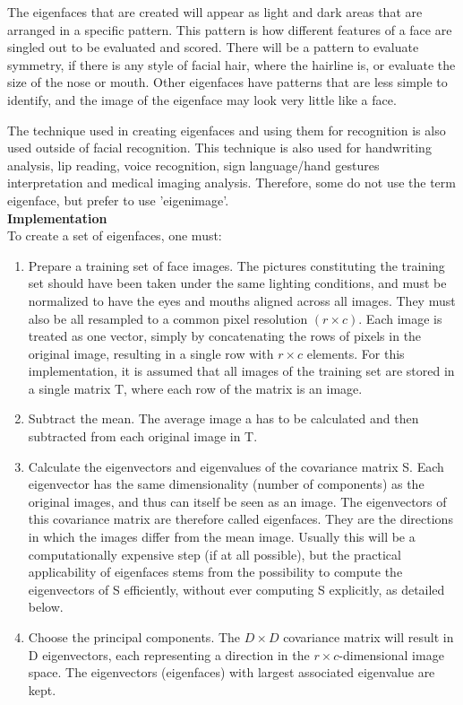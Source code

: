 \documentclass[12pt]{article}			%
\begin{document}
The eigenfaces that are created will appear as light and dark areas that are arranged in a specific pattern. This pattern is how different features of a face are singled out to be evaluated and scored. There will be a pattern to evaluate symmetry, if there is any style of facial hair, where the hairline is, or evaluate the size of the nose or mouth. Other eigenfaces have patterns that are less simple to identify, and the image of the eigenface may look very little like a face.

The technique used in creating eigenfaces and using them for recognition is also used outside of facial recognition. This technique is also used for handwriting analysis, lip reading, voice recognition, sign language/hand gestures interpretation and medical imaging analysis. Therefore, some do not use the term eigenface, but prefer to use 'eigenimage'.\\[2ex]
{\bf Implementation}\\
To create a set of eigenfaces, one must:
\begin{enumerate}
\item Prepare a training set of face images. The pictures constituting the training set should have been taken under the same lighting conditions, and must be normalized to have the eyes and mouths aligned across all images. They must also be all resampled to a common pixel resolution $(r \times c)$. Each image is treated as one vector, simply by concatenating the rows of pixels in the original image, resulting in a single row with $r \times c$ elements. For this implementation, it is assumed that all images of the training set are stored in a single matrix T, where each row of the matrix is an image.

\item Subtract the mean. The average image a has to be calculated and then subtracted from each original image in T.

\item Calculate the eigenvectors and eigenvalues of the covariance matrix S. Each eigenvector has the same dimensionality (number of components) as the original images, and thus can itself be seen as an image. The eigenvectors of this covariance matrix are therefore called eigenfaces. They are the directions in which the images differ from the mean image. Usually this will be a computationally expensive step (if at all possible), but the practical applicability of eigenfaces stems from the possibility to compute the eigenvectors of S efficiently, without ever computing S explicitly, as detailed below.

\item Choose the principal components. The $D \times D$ covariance matrix will result in D eigenvectors, each representing a direction in the $r \times c$-dimensional image space. The eigenvectors (eigenfaces) with largest associated eigenvalue are kept.
\end{enumerate}
\end{document}
